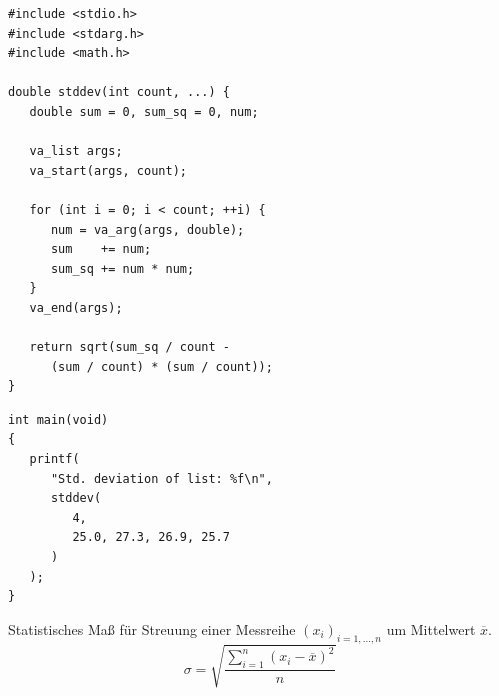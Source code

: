 \begin{frame}[fragile]
%
\begin{minipage}{.49\linewidth}
\begin{codebox}
\begin{verbatim}
#include <stdio.h>
#include <stdarg.h>
#include <math.h>
 
double stddev(int count, ...) {
   double sum = 0, sum_sq = 0, num;
   
   va_list args;   
   va_start(args, count);
   
   for (int i = 0; i < count; ++i) {
      num = va_arg(args, double);
      sum    += num;
      sum_sq += num * num;
   }
   va_end(args);
   
   return sqrt(sum_sq / count - 
      (sum / count) * (sum / count));
}
\end{verbatim}
\end{codebox}
\end{minipage}
%
\begin{minipage}{.49\linewidth}
\begin{codebox}
\begin{verbatim}
int main(void) 
{
   printf(
      "Std. deviation of list: %f\n", 
      stddev(
         4, 
         25.0, 27.3, 26.9, 25.7
      )
   );
}
\end{verbatim}
\end{codebox}
%
\vspace{-4pt}
\begin{hintbox}
\footnotesize Statistisches Maß für Streuung einer Messreihe $(x_i)_{i=1,\ldots,n}$ um Mittelwert 
$\overline{x}$.
\[
\sigma = \sqrt{
	\frac
		{\sum^{n}_{i=1}(x_i - \overline{x})^2}
		{n}
}
\]
\end{hintbox}
\end{minipage}
%
\end{frame}


